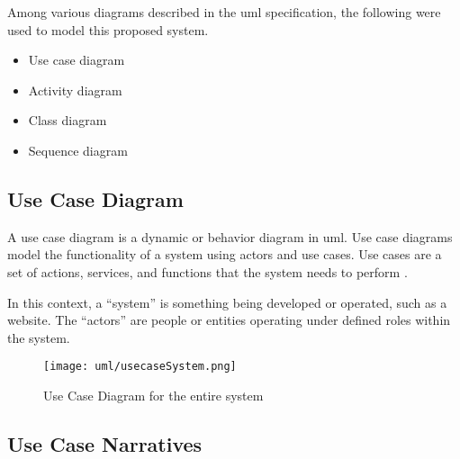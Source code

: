 \documentclass[12pt]{report}
\begin{document}
Among various diagrams described in the \acrshort{uml} specification, the following were used to model this proposed system.

\begin{itemize}
	\item Use case diagram
	\item Activity diagram
	\item Class diagram
	\item Sequence diagram
\end{itemize}

\newpage
\subsection{Use Case Diagram}
A use case diagram is a dynamic or behavior diagram in \acrshort{uml}. Use case diagrams model the functionality of a system using actors and use cases. Use cases are a set of actions, services, and functions that the system needs to perform \cite{vparadigm_2018_uml}.

In this context, a ``system'' is something being developed or operated, such as a website. The ``actors'' are people or entities operating under defined roles within the system.

\begin{figure}[H]
	\centering
	\texttt{[image: uml/usecaseSystem.png]}
	\caption{Use Case Diagram for the entire system}
	\label{fig:usecaseSystem}
\end{figure}

\newpage
\subsection{Use Case Narratives}
\end{document}
